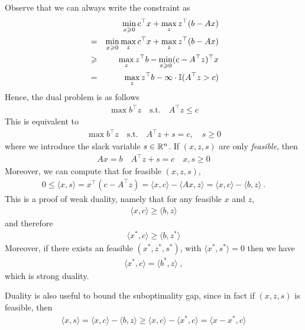 Observe that we can always write the constraint as 
\begin{eqnarray}
&& \min_{x \geqslant 0 } c^\top x + \max_{z} z^{\top}(b-Ax) \\
&=& \min_{x \geqslant 0} \max_{z} c^\top x + \max_{z} z^{\top}(b-Ax) \\
&\geqslant& \max_{z} z^{\top}b - \min_{x \geqslant 0} (c - A^{\top}z)^{\top}x\\
&=& \max_{z} z^{\top}b  - \infty \cdot \mathbb I(A^{\top}z > c)\\
\end{eqnarray}
Hence, the dual problem is as follows
\begin{eqnarray*}
\max b^\top z \quad \text{s.t.}\quad A^{\top} z \le c
\end{eqnarray*}
This is equivalent to 
\begin{eqnarray}
\max b^\top z \quad \text{s.t.}\quad A^{\top} z + s = c, \quad s \ge 0
\end{eqnarray}
where we introduce the slack variable $s \in \mathbb{R}^n$. If $(x,z,s)$ are only \emph{feasible}, then 
\begin{eqnarray}
Ax = b \quad A^{\top} z + s = c \quad x,s \ge 0
\end{eqnarray}
Moreover, we can compute that for feasible $(x,z,s)$,
\begin{eqnarray}
0 \le \langle x, s \rangle = x^{\top}(c - A^{\top}z) = \langle x, c \rangle - \langle Ax, z \rangle = \langle x, c \rangle - \langle b,z \rangle~.
\end{eqnarray}
This is a proof of weak duality, namely that for any feasible $x$ and $z$,
\begin{eqnarray}
\langle x, c \rangle  \ge \langle b,z \rangle
\end{eqnarray}
and therefore
\begin{eqnarray}
\langle x^*, c \rangle  \ge \langle b,z^* \rangle
\end{eqnarray}
Moreover, if there exists an feasible $(x^*,z^*,s^*)$, with $\langle x^*, s^* \rangle = 0$ then we have 
\begin{eqnarray}
\langle x^*, c \rangle = \langle b^*,z \rangle~,
\end{eqnarray}
which is strong duality. 

Duality is also useful to bound the suboptimality gap, since in fact if $(x,z,s)$ is feasible, then
\begin{eqnarray}
\langle x, s \rangle = \langle x, c \rangle - \langle b,z \rangle \ge \langle x,c \rangle - \langle x^*, c \rangle = \langle x - x^* , c \rangle
\end{eqnarray}

